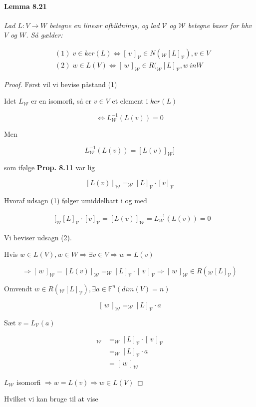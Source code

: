 \documentclass[paper=a4, fontsize=11pt]{scrartcl} %
\begin{document}
	\paragraph{Lemma 8.21} \textit{Lad $L : V \rightarrow W$ betegne en lineær afbildnings, og lad $\mathcal{V}$ og $\mathcal{W}$ betegne baser for hhv $V$ og $W$. Så gælder:}
	
	\begin{align*}
		&(1) \; v \in ker(L) \Leftrightarrow [\,v\,]_{\mathcal{V}} \in N(_{\mathcal{W}}[L]_{\mathcal{V}}), v \in V \\
		&(2) \; w \in L(V) \Leftrightarrow [\,w\,]_{\mathcal{W}} \in R(_{\mathcal{W}}[L]_{\mathcal{V}}, w \ in W
	\end{align*}
	
	
	
	\begin{proof}
		
		Først vil vi bevise påstand (1)
		
		Idet $L_{\mathcal{W}}$ er en isomorfi, så er $v \in V$ et element i $ker(L)$
		
		\[\Leftrightarrow L_{\mathcal{W}}^{-1}(L(v)) = 0 \tag{1}\]
		
		Men 
		
		\[L_{\mathcal{W}}^{-1}(L(v)) = [L(v)]_{\mathcal{W}}]\]
		
		som ifølge \textbf{Prop. 8.11} var lig
		
		\[[L(v)]_{\mathcal{W}} = _{\mathcal{W}}[L]_{\mathcal{V}} \cdot [v]_{\mathcal{V}}\]
		
		Hvoraf udsagn (1) følger umiddelbart i og med 
		
		\begin{align*}
			&[_{\mathcal{W}}[L]_{\mathcal{V}} \cdot [v]_{\mathcal{V}} = [L(v)]_{\mathcal{W}} = L_{\mathcal{W}}^{-1}(L(v)) = 0
		\end{align*}
		
		
		Vi beviser udsagn (2).
		
		Hvis $w \in L(V), w \in W \Rightarrow \exists v \in V \Rightarrow w = L(v)$
		
		\[\Rightarrow [\,w\,]_{\mathcal{W}} = [L(v)]_{\mathcal{W}} = _{\mathcal{W}}[L]_{\mathcal{V}} \cdot [\,v\,]_{\mathcal{V}} \Rightarrow [\,w\,]_{\mathcal{W}} \in R(_{\mathcal{W}}[L]_{\mathcal{V}})\]
		
		Omvendt $w \in R(_{\mathcal{W}}[L]_{\mathcal{V}}), \exists a \in \mathbb{F}^n (dim(V) = n)$
		
		\[[\,w\,]_{\mathcal{W}} = _{\mathcal{W}}[L]_{\mathcal{V}} \cdot a\]
		
		Sæt $v = L_{\mathcal{V}}(a)$
		
		\begin{align*}
			[L(v)]_{\mathcal{W}} &= _{\mathcal{W}}[L]_{\mathcal{V}} \cdot [\,v\,]_{\mathcal{V}}\\
			&= _{\mathcal{W}}[L]_{\mathcal{V}} \cdot a\\
			&= [\,w\,]_{\mathcal{W}}
		\end{align*}
		
		$L_{\mathcal{W}}$ isomorfi $\Rightarrow w = L(v) \Rightarrow w \in L(V)$
	\end{proof}
	Hvilket vi kan bruge til at vise 
	
\end{document}
